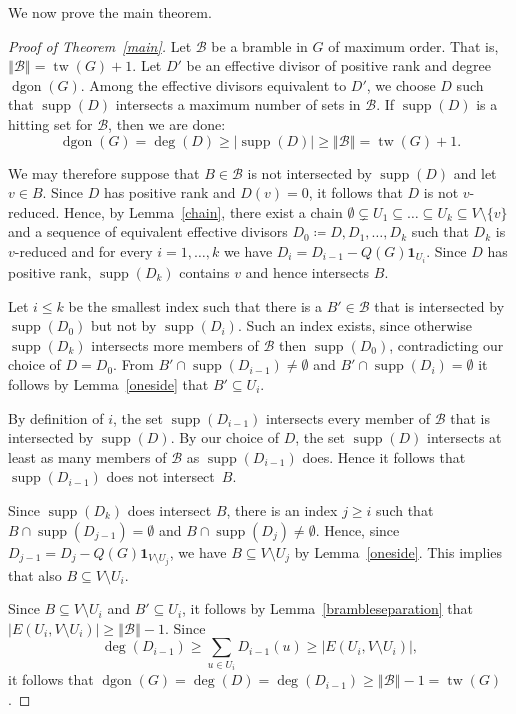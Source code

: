 \documentclass[ALCO,ThmDefs,Unicode,epreuves]{cedram}
\newcommand{\one}{\ensuremath{\mathbf{1}}}
\DeclareMathOperator{\tw}{tw}
\DeclareMathOperator{\dgon}{dgon}
\DeclareMathOperator{\supp}{supp}
\newcommand*{\B}{\mathcal{B}}
\newcommand*{\order}[1]{\left\Vert#1\right\Vert}
\begin{document}
\noindent We now prove the main theorem.
\begin{proof}[Proof of Theorem~\ref{main}]
Let $\B$ be a bramble in $G$ of maximum order. That is, $\order{\B} = \tw(G)+1$. Let $D'$ be an effective divisor of positive rank and degree $\dgon(G)$. Among the effective divisors equivalent to $D'$, we choose $D$ such that $\supp(D)$ intersects a maximum number of sets in $\B$. If $\supp(D)$ is a hitting set for $\B$, then we are done:
\begin{equation}
\dgon(G)=\deg(D) \geq |\supp(D)| \geq \order{\B} = \tw(G)+1.
\end{equation}

We may therefore suppose that $B\in\B$ is not intersected by $\supp(D)$ and let $v\in B$. Since $D$ has positive rank and $D(v)=0$, it follows that $D$ is not $v$-reduced. Hence, by Lemma~\ref{chain}, there exist a chain $\emptyset\subsetneq U_1\subseteq\ldots\subseteq U_k\subseteq V\setminus{\{v\}}$ and a sequence of equivalent effective divisors $D_0\coloneqq D,D_1,\ldots,D_k$ such that $D_k$ is $v$-reduced and for every $i=1,\ldots, k$ we have $D_i=D_{i-1}-Q(G)\one_{U_i}$. Since $D$ has positive rank, $\supp(D_k)$ contains $v$ and hence intersects $B$.

Let $i\leq k$ be the smallest index such that there is a $B'\in \B$ that is intersected by $\supp(D_0)$ but not by $\supp(D_i)$. Such an index exists, since otherwise $\supp(D_k)$ intersects more members of $\B$ then $\supp(D_0)$, contradicting our choice of $D=D_0$. From $B'\cap \supp(D_{i-1})\neq \emptyset$ and $B'\cap \supp(D_{i})=\emptyset$ it follows by Lemma~\ref{oneside} that $B'\subseteq U_i$. 

By definition of $i$, the set $\supp(D_{i-1})$ intersects every member of $\B$ that is intersected by $\supp(D)$. By our choice of $D$, the set $\supp(D)$ intersects at least as many members of $\B$ as $\supp(D_{i-1})$ does. Hence it follows that $\supp(D_{i-1})$ does not intersect~$B$. 

Since $\supp(D_k)$ does intersect $B$, there is an index $j\geq i$ such that $B\cap \supp(D_{j-1})=\emptyset$ and $B\cap \supp(D_{j})\neq\emptyset$. Hence, since $D_{j-1}=D_j-Q(G)\one_{V\setminus U_j}$, we have $B\subseteq V\setminus U_j$ by Lemma~\ref{oneside}. This implies that also $B\subseteq V\setminus U_i$. 

Since $B\subseteq V\setminus U_i$ and $B'\subseteq U_i$, it follows by Lemma~\ref{brambleseparation} that $|E(U_i,V\setminus U_i)|\geq \order{\B}-1$. Since 
\begin{equation}
\deg (D_{i-1})\geq \sum_{u\in U_i}D_{i-1}(u)\geq |E(U_i,V\setminus U_i)|,
\end{equation}
it follows that $\dgon(G)=\deg(D) = \deg(D_{i-1}) \geq \order{\B} - 1 = \tw(G)$.
\end{proof}
\end{document}
